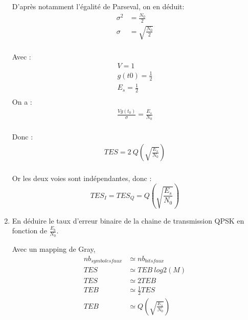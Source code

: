 \documentclass[frenchb]{article}
\begin{document}
\begin{enumerate}
        D'après notamment l'égalité de Parseval, on en déduit:
        \begin{equation*}
        \begin{split}
        \sigma^2 &= \frac{N_0}{2}  \\
        \sigma &= \sqrt{\frac{N_0}{2}} \\
        \end{split}
        \end{equation*}
        
        Avec : 
        \begin{equation*}
        \begin{split}
        V = 1 \\
        g(t0) = \frac{1}{2}\\
        E_s = \frac{1}{2} \\
        \end{split}
        \end{equation*}
        On a :
        \begin{equation*}
        \begin{split}
        \frac{V g(t_0)}{\sigma} = \frac{E_s}{N_0} \\
        \end{split}
        \end{equation*}
        
        Donc :
        \begin{equation*}
        \begin{split}
        TES = 2 \ Q\left(\sqrt{\frac{E_s}{N_0}} \right) \\
    	    \end{split}
        \end{equation*} 
        
        Or les deux voies sont indépendantes, donc : 
        $$ \boxed{TES_I = TES_Q =  Q\left(\sqrt{\frac{E_s}{N_0}} \right)} $$
    \item En déduire le taux d'erreur binaire de la chaine de transmission QPSK en fonction de $\frac{E_b}{N_0}$.
    
    Avec un mapping de Gray, 
    \begin{equation*}
    \begin{split}
    	     nb_{symboles faux} & \simeq nb_{bits faux} \\
         TES & \simeq TEB \ log2(M)\\
         TES & \simeq 2 TEB\\
         TEB & \simeq \frac{1}{2} TES \\                 
         TEB & \simeq Q\left(\sqrt{\frac{E_s}{N_0}}\right) \\      
     \end{split}
     \end{equation*}
\end{enumerate}
\end{document}

